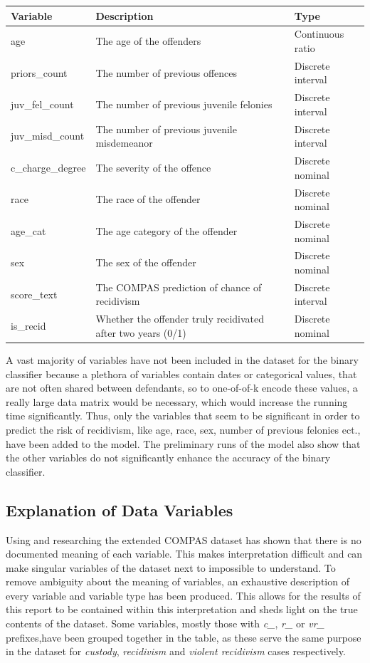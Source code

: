 \documentclass[11pt, fleqn, titlepage]{article}
\begin{document}
	
	\begin{table}[H]\label{variable}
		\centering
		\begin{tabular}{l l l}
			\toprule
			\textbf{Variable} & \textbf{Description} & \textbf{Type} \\ \midrule
			age & The age of the offenders & Continuous ratio \\
			priors\_count & The number of previous offences & Discrete interval \\
			juv\_fel\_count & The number of previous juvenile felonies & Discrete interval \\
			juv\_misd\_count & The number of previous juvenile misdemeanor & Discrete interval \\
			c\_charge\_degree & The severity of the offence & Discrete nominal \\
			race & The race of the offender & Discrete nominal \\
			age\_cat & The age category of the offender & Discrete nominal \\
			sex & The sex of the offender & Discrete nominal \\
			\hdashline
			score\_text & The COMPAS prediction of chance of recidivism & Discrete interval \\
			is\_recid & Whether the offender truly recidivated after two years (0/1) & Discrete nominal \\ \bottomrule
		\end{tabular}
	\end{table} \noindent
	A vast majority of variables have not been included in the dataset for the binary classifier because a plethora of variables contain dates or categorical values, that are not often shared between defendants, so to one-of-of-k encode these values, a really large data matrix would be necessary, which would increase the running time significantly. Thus, only the variables that seem to be significant in order to predict the risk of recidivism, like age, race, sex, number of previous felonies ect., have been added to the model. The preliminary runs of the model also show that the other variables do not significantly enhance the accuracy of the binary classifier.
		
		
	\subsection{Explanation of Data Variables} \label{dataExamination}
	Using and researching the extended COMPAS dataset has shown that there is no documented meaning of each variable. This makes interpretation difficult and can make singular variables of the dataset next to impossible to understand. To remove ambiguity about the meaning of variables, an exhaustive description of every variable and variable type has been produced. This allows for the results of this report to be contained within this interpretation and sheds light on the true contents of the dataset. Some variables, mostly those with \textit{c\_}, \textit{r\_} or \textit{vr\_} prefixes,have been grouped together in the table, as these serve the same purpose in the dataset for \textit{custody}, \textit{recidivism} and \textit{violent recidivism} cases respectively. 
	
\end{document}
